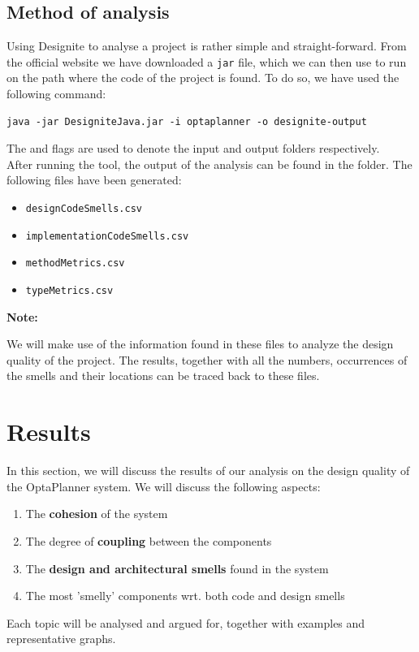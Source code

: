     \subsection{Method of analysis}
        Using Designite to analyse a project is rather simple and straight-forward. From the official website we have downloaded a \texttt{jar} file, which we can then use to run on the path where the code of the project is found. To do so, we have used the following command:
        \begin{lstlisting}
java -jar DesigniteJava.jar -i optaplanner -o designite-output   \end{lstlisting}
        The  and  flags are used to denote the input and output folders respectively. \\
        After running the tool, the output of the analysis can be found in the  folder. The following files have been generated:
        \begin{itemize}
            \item \texttt{designCodeSmells.csv}
            \item \texttt{implementationCodeSmells.csv}
            \item \texttt{methodMetrics.csv}
            \item \texttt{typeMetrics.csv}
        \end{itemize}
        \textbf{Note:}
            \begin{adjustwidth}{1cm}{}
            We will make use of the information found in these files to analyze the design quality of the project. The results, together with all the numbers, occurrences of the smells and their locations can be traced back to these files.
            \end{adjustwidth}
        \clearpage
        
\section*{Results}
    In this section, we will discuss the results of our analysis on the design quality of the OptaPlanner system. We will discuss the following aspects:
    \begin{enumerate}
        \item The \textbf{cohesion} of the system
        \item The degree of \textbf{coupling} between the components
        \item The \textbf{design and architectural smells} found in the system
        \item The most 'smelly' components wrt. both code and design smells
    \end{enumerate} 
    Each topic will be analysed and argued for, together with examples and representative graphs.
    
